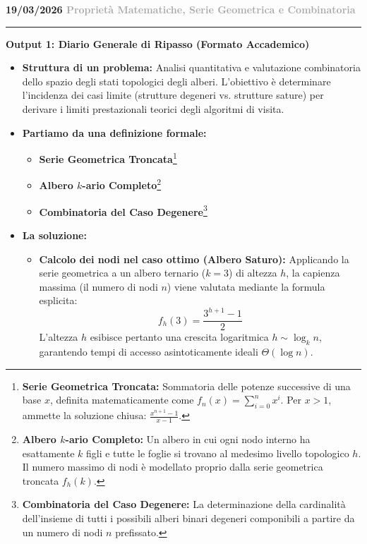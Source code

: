 \documentclass[a4paper, 11pt]{report}
\newcommand{\lezione}[2]{
\vspace{2em}
\noindent\textbf{\Large #1 \hfill \textcolor{darkgray}{#2}}
\vspace{0.5em}
\hrule
\vspace{1.5em}
}
\newcommand{\definizione}[2]{%
\textbf{#1}\footnote{\textbf{#1:} #2}%
}
\begin{document}
\lezione{19/03/2026}{Proprietà Matematiche, Serie Geometrica e Combinatoria}

\vspace{0.5cm}
\textbf{Output 1: Diario Generale di Ripasso (Formato Accademico)}

\begin{itemize}
    \item \textbf{Struttura di un problema:}
    Analisi quantitativa e valutazione combinatoria dello spazio degli stati topologici degli alberi. L'obiettivo è determinare l'incidenza dei casi limite (strutture degeneri vs. strutture sature) per derivare i limiti prestazionali teorici degli algoritmi di visita.

    \item \textbf{Partiamo da una definizione formale:}
    \begin{itemize}
        \item \definizione{Serie Geometrica Troncata}{Sommatoria delle potenze successive di una base $x$, definita matematicamente come $f_n(x) = \sum_{i=0}^n x^i$. Per $x > 1$, ammette la soluzione chiusa: $\frac{x^{n+1}-1}{x-1}$.}
        \item \definizione{Albero $k$-ario Completo}{Un albero in cui ogni nodo interno ha esattamente $k$ figli e tutte le foglie si trovano al medesimo livello topologico $h$. Il numero massimo di nodi è modellato proprio dalla serie geometrica troncata $f_h(k)$.}
        \item \definizione{Combinatoria del Caso Degenere}{La determinazione della cardinalità dell'insieme di tutti i possibili alberi binari degeneri componibili a partire da un numero di nodi $n$ prefissato.}
    \end{itemize}

    \item \textbf{La soluzione:}
    \begin{itemize}
        \item \textbf{Calcolo dei nodi nel caso ottimo (Albero Saturo):} Applicando la serie geometrica a un albero ternario ($k=3$) di altezza $h$, la capienza massima (il numero di nodi $n$) viene valutata mediante la formula esplicita:
        \[ f_h(3) = \frac{3^{h+1} - 1}{2} \]
        L'altezza $h$ esibisce pertanto una crescita logaritmica $h \sim \log_k n$, garantendo tempi di accesso asintoticamente ideali $\Theta(\log n)$.


\end{itemize}
\end{itemize}
\end{document}

